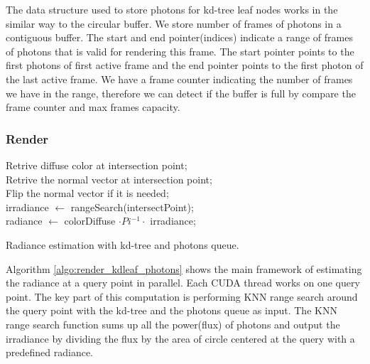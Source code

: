 The data structure used to store photons for kd-tree leaf nodes works in the similar way to the circular buffer. We store number of frames of photons in a contiguous buffer. The start and end pointer(indices) indicate a range of frames of photons that is valid for rendering this frame. The start pointer points to the first photons of first active frame and the end pointer points to the first photon of the last active frame. We have a frame counter indicating the number of frames we have in the range, therefore we can detect if the buffer is full by compare the frame counter and max frames capacity. 


\subsubsection{Render} 

\begin{algorithm} 
	\SetAlgoLined
	
	 {
		Retrive diffuse color at intersection point; \\
		Retrive the normal vector at intersection point; \\
		Flip the normal vector if it is needed; \\ 
		irradiance \(\leftarrow\) rangeSearch(intersectPoint); \\
		radiance \(\leftarrow\) colorDiffuse \( \cdot Pi^{-1} \cdot\) irradiance; \\ 	
	}
	\caption{Radiance estimation with kd-tree and photons queue.} 	
	\label{algo:render_kdleaf_photons} 
\end{algorithm}

Algorithm \ref{algo:render_kdleaf_photons} shows the main framework of estimating the radiance at a query point in parallel. Each CUDA thread works on one query point. The key part of this computation is performing KNN range search around the query point with the kd-tree and the photons queue as input. The KNN range search function sums up all the power(flux) of photons and output the irradiance by dividing the flux by the area of circle centered at the query with a predefined radiance. 

